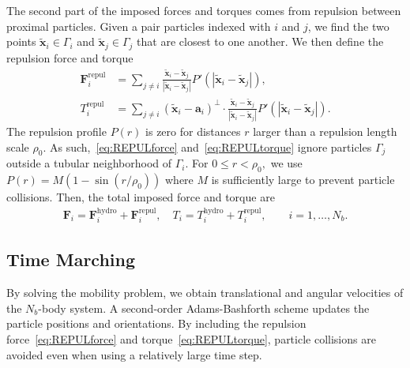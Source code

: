 \documentclass[lineno]{jfm}
\renewcommand{\aa}{\mathbf{a}}
\newcommand{\FF}{\mathbf{F}}
\newcommand{\xx}{\mathbf{x}}
\newcommand{\yy}{\mathbf{y}}
\begin{document}
The second part of the imposed forces and torques comes from repulsion
between proximal particles. Given a pair particles indexed with $i$ and
$j$, we find the two points $\tilde{\xx}_i \in \Gamma_i$ and
$\tilde{\xx}_j \in \Gamma_j$ that are closest to one another. We then
define the repulsion force and torque
\begin{align}
%
  \label{eq:REPULforce}
  \FF_i^{\text{repul}} &= \sum_{j \neq i} 
    \frac{\tilde{\xx}_i - \tilde{\xx}_j}
    {|\tilde{\xx}_i - \tilde{\xx}_j|} 
    P'(|\tilde{\xx}_i - \tilde{\xx}_j|), \\
  \label{eq:REPULtorque}
  T_i^{\text{repul}} &= \sum_{j \neq i} 
    (\tilde{\xx}_i - \aa_i)^{\perp} \cdot 
    \frac{\tilde{\xx}_i - \tilde{\xx}_j}
    {|\tilde{\xx}_i - \tilde{\xx}_j|} 
    P'(|\tilde{\xx}_i - \tilde{\xx}_j|).
\end{align}
The repulsion profile $P(r)$ is zero for distances $r$ larger than a
repulsion length scale $\rho_0$. As such,~\eqref{eq:REPULforce}
and~\eqref{eq:REPULtorque} ignore particles $\Gamma_j$ outside a
tubular neighborhood of $\Gamma_i$. For $0 \leq r < \rho_0,$ we use
$P(r) = M(1 - \sin(r/\rho_0))$ where $M$ is sufficiently large to
prevent particle collisions. Then, the total imposed force and torque
are
\begin{align}
  \FF_i = \FF_i^{\text{hydro}} + \FF_i^{\text{repul}},\quad
  T_i = T_i^{\text{hydro}} + T_i^{\text{repul}}, \qquad
  i=1,\ldots,N_b.
\end{align}


\subsection{Time Marching}
By solving the mobility problem, we obtain translational and angular
velocities of the $N_b$-body system. A second-order Adams-Bashforth
scheme updates the particle positions and orientations. By including the
repulsion force~\eqref{eq:REPULforce} and
torque~\eqref{eq:REPULtorque}, particle collisions are avoided even
when using a relatively large time step. 



\end{document}

